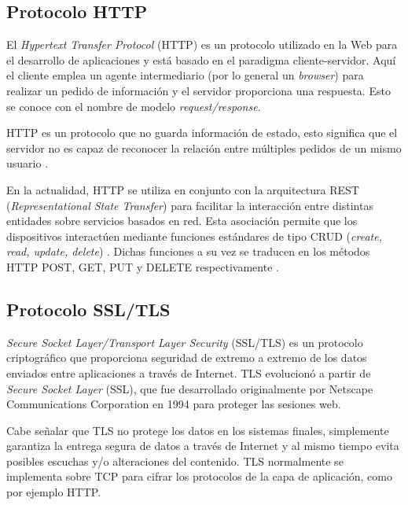 \subsection{Protocolo HTTP}
\label{sec:Protocolo HTTP}

El \textit{Hypertext Transfer Protocol} (HTTP)\citep{http:1} es un protocolo utilizado en la Web para el desarrollo de aplicaciones y está basado en el paradigma cliente-servidor. Aquí el cliente emplea un agente intermediario (por lo general un \textit{browser}) para realizar un pedido de información y el servidor proporciona una respuesta. Esto se conoce con el nombre de modelo \textit{request/response}.

HTTP es un protocolo que no guarda información de estado, esto significa que el servidor no es capaz de reconocer la relación entre múltiples pedidos de un mismo usuario  \citep{oreilly:1}.

En la actualidad, HTTP se utiliza en conjunto con la arquitectura REST (\textit{Representational State Transfer}) \citep{rest} para facilitar la interacción entre distintas entidades sobre servicios basados en red. Esta asociación permite que los dispositivos interactúen mediante funciones estándares de tipo CRUD (\textit{create, read, update, delete})  \citep{10.1145/3292674}. Dichas funciones a su vez se traducen en los métodos HTTP POST, GET, PUT y DELETE respectivamente \citep{GLAROUDIS2020107037}. 


\subsection{Protocolo SSL/TLS}
\label{sec:Protocolo SSL/TLS}
\textit{Secure Socket Layer/Transport Layer Security} (SSL/TLS) es un protocolo criptográfico que proporciona seguridad de extremo a extremo de los datos enviados entre aplicaciones a través de Internet.
TLS evolucionó a partir de \textit{Secure Socket Layer} (SSL), que fue desarrollado originalmente por Netscape Communications Corporation en 1994 para proteger las sesiones web. 


Cabe señalar que TLS no protege los datos en los sistemas finales, simplemente garantiza la entrega segura de datos a través de Internet y al mismo tiempo evita posibles escuchas y/o alteraciones del contenido.
TLS normalmente se implementa sobre TCP \citep{rfc793} para cifrar los protocolos de la capa de aplicación, como por ejemplo HTTP.

